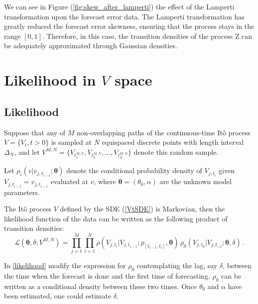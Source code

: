 \documentclass[11pt]{article}
\theoremstyle{definition}
\begin{document}
We can see in Figure (\ref{fig:skew_after_lamperti}) the effect of the Lamperti transformation upon the forecast error data. 
The Lamperti transformation has greatly reduced the forecast error skewness, ensuring that the process stays in the range $[0,1]$. Therefore, in this case, the transition densities of the process Z can be adequately approximated through Gaussian densities.

\section{Likelihood in $V$ space} \label{Section_4}

\subsection{Likelihood}

Suppose that any of $M$ non-overlapping paths of the continuous-time It\^{o} process $V = \{ V_t, t >0 \}$ is sampled at $N$ equispaced discrete points with length interval $\Delta_N$, and let $ V^{M,N}=\{ V_{t_1^{M,N}} , V_{t_2^{M,N}} ,\ldots , V_{t_N^{M,N}} \}$ denote this random sample. 

Let $\rho_i(v \vert v_{j, t_{i-1}} ; \bm{\theta})$ denote the conditional probability density of $V_{j, t_i}$ given $V_{j, t_{i-1}} = v_{j, t_{i-1}}$ evaluated at $v$, where $\bm{\theta} = (\theta_0, \alpha)$ are the unknown model parameters.

The It\^{o} process $V$ defined by the SDE (\ref{VtSDE}) is Markovian, then the likelihood function of the data can be written as the following product of transition densities:  
\begin{equation}
\mathcal{L}(\bm{\theta},\delta; V^{M,N}) = \prod\limits_{j=1}^M \prod\limits_{i=1}^N \rho ( {V_{j, t_i}| V_{j, t_{i-1}}} ; p_{[t_{i-1}, t_{i}]},  \bm{\theta} )  \, \rho_0 (V_{j, t_0}|V_{j, t_{-\delta}};\bm{\theta},\delta) \,.
\label{likelihood}
\end{equation}

 {\color{red} In \ref{likelihood} modify the expression for $\rho_0$ contemplating the lag, say $\delta$, between the time when the forecast is done and the first time of forecasting. $\rho_0$ can be written as a conditional density between these two times. Once $\theta_0$ and $\alpha$ have been estimated, one could estimate $\delta$.}
\end{document}
